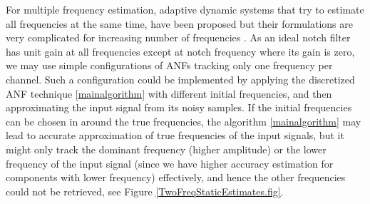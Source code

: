 \documentclass{UCF_ETD}
\begin{document}
For multiple frequency estimation, adaptive dynamic systems that try to estimate all frequencies at the same time, have been proposed but their formulations are very complicated for increasing number of frequencies \cite{hou13}.
As an ideal notch filter %
has  unit gain at all frequencies except at  notch frequency where its gain is zero,
we may use simple configurations of ANFs tracking only one frequency per channel.
 Such a configuration could be implemented by applying the discretized ANF technique \eqref{mainalgorithm}
 with  %
  different initial frequencies, and then  approximating the input signal
  from its noisy samples.
  If the initial frequencies can be chosen in around the true frequencies,
the algorithm \eqref{mainalgorithm} may lead to accurate approximation of true frequencies
 of the input signals, but it
might only track the dominant frequency (higher amplitude)
  or the lower frequency of the input signal (since we  have higher accuracy estimation for  components with lower frequency) effectively,
      and hence the other frequencies could not be retrieved, see Figure \ref{TwoFreqStaticEstimates.fig}. %
\end{document}
